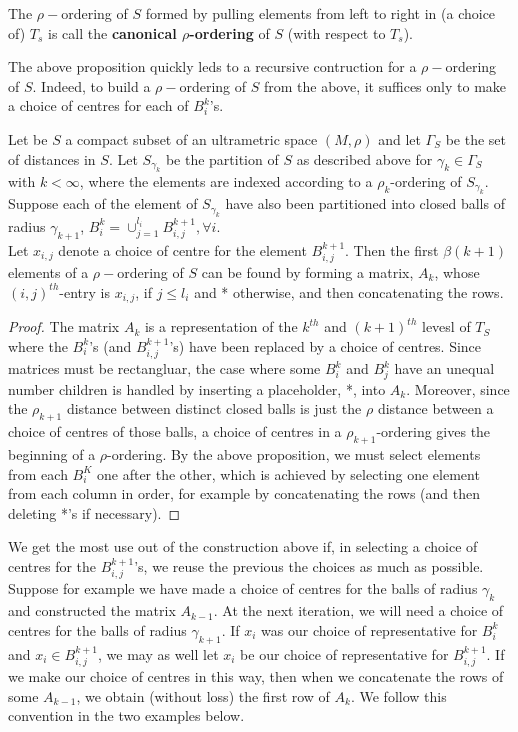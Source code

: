\begin{definition*}
The $\rho-$ordering of $S$ formed by pulling elements from left to right in (a choice of) $T_s$ is call the \textbf{canonical $\rho$-ordering} of $S$ (with respect to $T_s$).
\end{definition*}

The above proposition quickly leds to a recursive contruction for a $\rho-$ordering of $S$. Indeed, to build a $\rho-$ordering of $S$ from the above, it suffices only to make a choice of centres for each of $B^k_i$'s.

\begin{proposition*}
Let be $S$ a compact subset of an ultrametric space $(M, \rho)$ and let $\Gamma_S$ be the set of distances in $S$. Let $S_{\gamma_k}$ be the partition of $S$ as described above for $\gamma_k \in \Gamma_S$ with $k < \infty$, where the elements are indexed according to a $\rho_k$-ordering of $S_{\gamma_k}$. Suppose each of the element of $S_{\gamma_k}$ have also been partitioned into closed balls of radius $\gamma_{k+1}$, $B^k_i =\cup_{j=1}^{l_i} B^{k+1}_{i,j}, \forall i$.\\

Let $x_{i,j}$ denote a choice of centre for the element $B^{k+1}_{i,j}$. Then the first $\beta(k+1)$ elements of a $\rho-$ordering of $S$ can be found by forming a matrix, $A_k$, whose $(i,j)^{th}$-entry is $x_{i,j}$, if $j \leq l_i$ and * otherwise, and then concatenating the rows.
\end{proposition*}


\begin{proof}
The matrix $A_k$ is a representation of the $k^{th}$ and $(k+1)^{th}$ levesl of $T_S$ where the $B^k_i$'s (and $B^{k+1}_{i,j}$'s) have been replaced by a choice of centres. Since matrices must be rectangluar, the case where some $B^k_i$ and $B^k_j$ have an unequal number children is handled by inserting a placeholder, *, into $A_k$.  Moreover, since the $\rho_{k+1}$ distance between distinct closed balls is just the $\rho$ distance between a choice of centres of those  balls, a choice of centres in a $\rho_{k+1}$-ordering gives the beginning of a $\rho$-ordering.  By the above proposition, we must select elements from each $B^K_i$ one after the other, which is achieved by selecting one element from each column in order, for example by concatenating the rows (and then deleting *'s if necessary). 
\end{proof}

We get the most use out of the construction above if, in selecting a choice of centres for the $B^{k+1}_{i,j}$'s, we reuse the previous the choices as much as possible. Suppose for example we have made a choice of centres for the balls of radius $\gamma_k$ and constructed the matrix $A_{k-1}$. At the next iteration, we will need a choice of centres for the balls of radius $\gamma_{k+1}$. If $x_i$ was our choice of representative for $B^k_i$ and $x_i \in B^{k+1}_{i,j}$, we may as well let $x_i$ be our choice of representative for $B^{k+1}_{i,j}$. If we make our choice of centres in this way, then when we concatenate the rows of some $A_{k-1}$, we obtain (without loss) the first row of $A_k$. We follow this convention in the two examples below.

